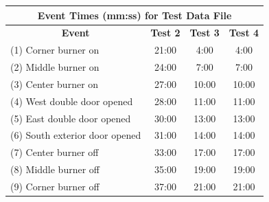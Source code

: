 \documentclass[12pt,oneside]{book}
\begin{document}
\begin{figure}[!ht]
\begin{minipage}[b]{0.8\columnwidth}
	\begin{flushleft}
	\small
	\begin{tabular}{lccc}
\multicolumn{4}{c}{\normalsize Event Times (mm:ss) for Test Data File} \\
\toprule
\multicolumn{1}{c}{\textbf{Event}} & \textbf{Test 2} & \textbf{Test 3} & \textbf{Test 4} \\
\midrule
(1) Corner burner on 			& 	21:00		  &		4:00		&		4:00	  \\
(2) Middle burner on 			&   24:00		  &		7:00		&		7:00	  \\
(3) Center burner on 			&   27:00		  &	   10:00		&	   10:00	  \\
(4) West double door opened 	&   28:00		  &    11:00		&	   11:00	  \\
(5) East double door opened 	&   30:00		  &    13:00		&	   13:00	  \\
(6) South exterior door opened 	&   31:00		  &    14:00		&	   14:00	  \\
(7) Center burner off 			&   33:00		  &    17:00		&	   17:00	  \\
(8) Middle burner off 			&   35:00		  &    19:00		&	   19:00	  \\
(9) Corner burner off 			&   37:00		  &    21:00		&	   21:00	  \\
\bottomrule
\end{tabular}
	\end{flushleft}
\end{minipage}
\begin{minipage}[b]{0.9\columnwidth}
	\vspace{15pt}
	\centering

\end{minipage}
\end{figure}
\end{document}
